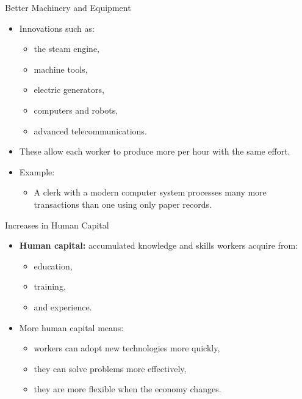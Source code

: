 \documentclass[aspectratio=169]{beamer}
\begin{document}
\begin{frame}{Better Machinery and Equipment}
\transfade
\begin{itemize}[<+->]
  \item Innovations such as:
  \begin{itemize}[<+->]
    \item the steam engine,
    \item machine tools,
    \item electric generators,
    \item computers and robots,
    \item advanced telecommunications.
  \end{itemize}
  \item These allow each worker to produce \alert{more} per hour with the same effort.
  \item Example:
  \begin{itemize}[<+->]
    \item A clerk with a modern computer system processes many more transactions than one using only paper records.
  \end{itemize}
\end{itemize}
\end{frame}

\begin{frame}{Increases in Human Capital}
\transfade
\begin{itemize}[<+->]
  \item \textbf{Human capital:} accumulated knowledge and skills workers acquire from:
  \begin{itemize}[<+->]
    \item education,
    \item training,
    \item and experience.
  \end{itemize}
  \item More human capital means:
  \begin{itemize}[<+->]
    \item workers can adopt new technologies more quickly,
    \item they can solve problems more effectively,
    \item they are more flexible when the economy changes.
  \end{itemize}
\end{itemize}
\end{frame}
\end{document}
